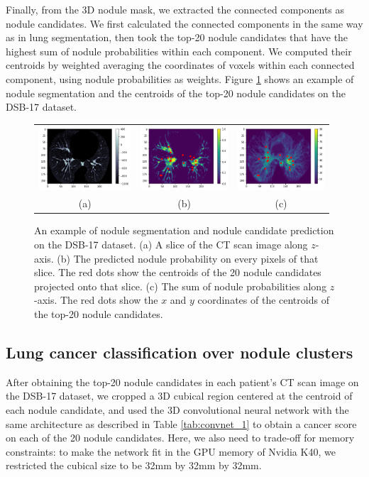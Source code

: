 \documentclass{article}
\begin{document}
Finally, from the 3D nodule mask, we extracted the connected components as nodule candidates. We first calculated the connected components in the same way as in lung segmentation, then took the top-20 nodule candidates that have the highest sum of nodule probabilities within each component. We computed their centroids by weighted averaging the coordinates of voxels within each connected component, using nodule probabilities as weights. Figure \ref{fig:nodule_segmentation_cluster} shows an example of nodule segmentation and the centroids of the top-20 nodule candidates on the DSB-17 dataset.

\begin{figure}[t]
  \centering
  \begin{tabular}{ccc}
  \includegraphics[height=90px]{figures/nodule_seg_pred_1.png} &
  \includegraphics[height=90px]{figures/nodule_seg_pred_2.png} &
  \includegraphics[height=90px]{figures/nodule_seg_pred_3.png} \\
  (a) & (b) & (c) \\
  \end{tabular}
  \caption{An example of nodule segmentation and nodule candidate prediction on the DSB-17 dataset. (a) A slice of the CT scan image along $z$-axis. (b) The predicted nodule probability on every pixels of that slice. The red dots show the centroids of the 20 nodule candidates projected onto that slice. (c) The sum of nodule probabilities along $z$-axis. The red dots show the $x$ and $y$ coordinates of the centroids of the top-20 nodule candidates.}
  \label{fig:nodule_segmentation_cluster}
\end{figure}

\subsection{Lung cancer classification over nodule clusters}
After obtaining the top-20 nodule candidates in each patient's CT scan image on the DSB-17 dataset, we cropped a 3D cubical region centered at the centroid of each nodule candidate, and used the 3D convolutional neural network with the same architecture as described in Table \ref{tab:convnet_1} to obtain a cancer score on each of the 20 nodule candidates. Here, we also need to trade-off for memory constraints: to make the network fit in the GPU memory of Nvidia K40, we restricted the cubical size to be 32mm by 32mm by 32mm.
\end{document}

